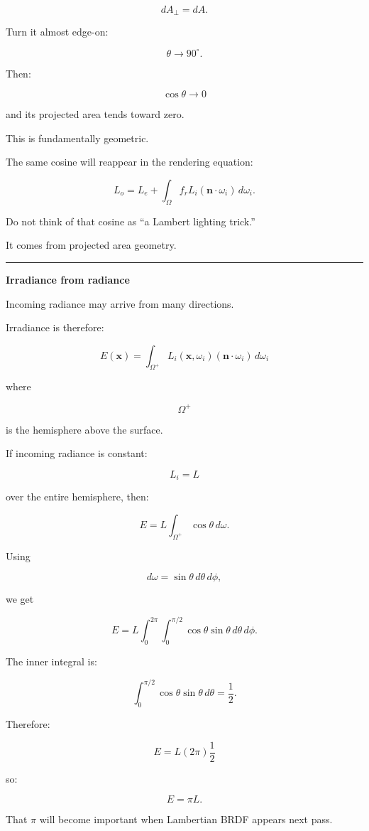 \[
dA_\perp=dA.
\]

Turn it almost edge-on:

\[
\theta\rightarrow90^\circ.
\]

Then:

\[
\cos\theta\rightarrow0
\]

and its projected area tends toward zero.

This is fundamentally geometric.

The same cosine will reappear in the rendering equation:

\[
L_o=
L_e+
\int_\Omega
f_r
L_i
(\mathbf n\cdot\omega_i)
\,d\omega_i.
\]

Do not think of that cosine as ``a Lambert lighting trick.''

It comes from projected area geometry.

\begin{center}\rule{0.5\linewidth}{0.5pt}\end{center}

\textbf{Irradiance from radiance}

Incoming radiance may arrive from many directions.

Irradiance is therefore:

\[
\boxed{
E(\mathbf x)
=
\int_{\Omega^+}
L_i(\mathbf x,\omega_i)
(\mathbf n\cdot\omega_i)
\,d\omega_i
}
\]

where

\[
\Omega^+
\]

is the hemisphere above the surface.

If incoming radiance is constant:

\[
L_i=L
\]

over the entire hemisphere, then:

\[
E=
L
\int_{\Omega^+}\cos\theta\,d\omega.
\]

Using

\[
d\omega=\sin\theta\,d\theta\,d\phi,
\]

we get

\[
E=
L
\int_0^{2\pi}
\int_0^{\pi/2}
\cos\theta\sin\theta
\,d\theta\,d\phi.
\]

The inner integral is:

\[
\int_0^{\pi/2}
\cos\theta\sin\theta\,d\theta
=
\frac12.
\]

Therefore:

\[
E=
L(2\pi)\frac12
\]

so:

\[
\boxed{
E=\pi L.
}
\]

That \(\pi\) will become important when Lambertian BRDF appears next pass.

